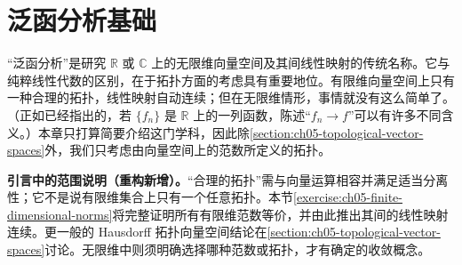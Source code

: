 \documentclass[../main.tex]{subfiles}
\begin{document}
\chapter{泛函分析基础}\label{chapter:ch05-functional-analysis}
“泛函分析”是研究 $\mathbb R$ 或 $\mathbb C$ 上的无限维向量空间及其间线性映射的传统名称。它与纯粹线性代数的区别，在于拓扑方面的考虑具有重要地位。有限维向量空间上只有一种合理的拓扑，线性映射自动连续；但在无限维情形，事情就没有这么简单了。（正如已经指出的，若 $\{f_n\}$ 是 $\mathbb R$ 上的一列函数，陈述“$f_n\to f$”可以有许多不同含义。）本章只打算简要介绍这门学科，因此除\cref{section:ch05-topological-vector-spaces}外，我们只考虑由向量空间上的范数所定义的拓扑。
\begin{remark}
\textbf{引言中的范围说明（重构新增）。}“合理的拓扑”需与向量运算相容并满足适当分离性；它不是说有限维集合上只有一个任意拓扑。本节\cref{exercise:ch05-finite-dimensional-norms}将完整证明所有有限维范数等价，并由此推出其间的线性映射连续。更一般的 Hausdorff 拓扑向量空间结论在\cref{section:ch05-topological-vector-spaces}讨论。无限维中则须明确选择哪种范数或拓扑，才有确定的收敛概念。
\end{remark}






\end{document}
